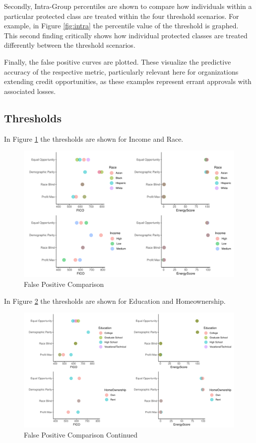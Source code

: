 \documentclass[11pt,]{article}
\begin{document}
Secondly, Intra-Group percentiles are shown to compare how individuals
within a particular protected class are treated within the four
threshold scenarios. For example, in Figure \ref{fig:intra} the
percentile value of the threshold is graphed. This second finding
critically shows how individual protected classes are treated
differently between the threshold scenarios.

Finally, the false positive curves are plotted. These visualize the
predictive accuracy of the respective metric, particularly relevant here
for organizations extending credit opportunities, as these examples
represent errant approvals with associated losses.

\hypertarget{thresholds}{%
\subsection{Thresholds}\label{thresholds}}

In Figure \ref{fig:fpfig1} the thresholds are shown for Income and Race.

\begin{figure}
\centering
\includegraphics{figs/fpfig1.pdf}
\caption{\label{fig:fpfig1}False Positive Comparison}
\end{figure}

In Figure \ref{fig:fpfig2} the thresholds are shown for Education and
Homeownership.

\begin{figure}
\centering
\includegraphics{figs/fpfig2.pdf}
\caption{\label{fig:fpfig2}False Positive Comparison Continued}
\end{figure}
\end{document}
